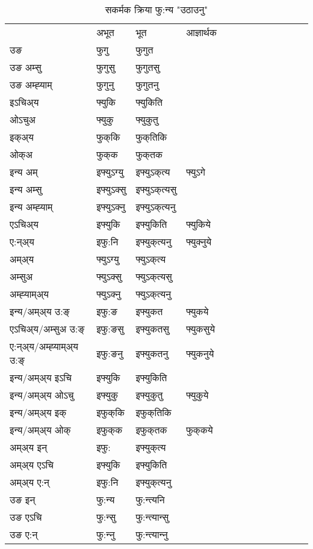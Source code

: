 \begin{table}[H]
\label{uk.vt} \centering
\caption{सकर्मक क्रिया  फु:न्य  "उठाउनु"  }
\begin{tabular}{l|l|l|l|l|l|l|l|l|l|l|l|l}  \toprule
&अभूत & भूत & आज्ञार्थक \\ 
उङ &फुगु &फुगुत \\ 
उङ अम्सु &फुगुसु &फुगुतसु \\ 
उङ अम्ह्‍याम् &फुगुनु &फुगुतनु \\ 
इऽचिअ्य &फ्युकि &फ्युकिति   \\ 
ओऽचुअ &फ्युकु &फ्युकुतु   \\ 
इक्अ्य &फुक्‌कि &फुक्‌तिकि   \\ 
ओक्अ &फुक्‌क &फुक्‌तक   \\ 
इन्य अम् & इफ्युऽग्यु  & इफ्युऽक्‌त्य &फ्युऽगे  \\ 
इन्य अम्सु & इफ्युऽक्सु  & इफ्युऽक्‌त्यसु   \\ 
इन्य अम्ह्‍याम् & इफ्युऽक्‍नु  & इफ्युऽक्‌त्यनु   \\ 
एऽचिअ्य & इफ्युकि & इफ्युकिति &फ्युकिये    \\ 
ए:न्अ्य & इफु:नि  & इफ्युक्‌त्यनु &फ्युक्‍नुये  \\ 
अम्अ्य & फ्युऽग्यु  & फ्युऽक्‌त्य  \\ 
अम्सुअ & फ्युऽक्सु & फ्युऽक्‌त्यसु  \\ 
अम्ह्‍याम्अ्य & फ्युऽक्‍नु  & फ्युऽक्‌त्यनु \\ 
\midrule
इन्य/अम्अ्य उ:ङ्‌&इफु:ङ & इफ्युकत &फ्युकये \\ 
एऽचिअ्य/अम्सुअ उ:ङ्‌ &इफु:ङसु & इफ्युकतसु &फ्युकसुये \\ 
ए:न्अ्य/अम्ह्‍याम्अ्य उ:ङ्‌ &इफु:ङनु & इफ्युकतनु &फ्युकनुये \\ 
इन्य/अम्अ्य इऽचि & इफ्युकि & इफ्युकिति    \\ 
इन्य/अम्अ्य ओऽचु & इफ्युकु & इफ्युकुतु  &फ्युकुये  \\ 
इन्य/अम्अ्य इक् & इफुक्‌कि & इफुक्‌तिकि   \\ 
इन्य/अम्अ्य ओक् & इफुक्‌क & इफुक्‌तक  &फुक्‌कये  \\ 
अम्अ्य इन् & इफु: & इफ्युक्‌त्य   \\ 
अम्अ्य एऽचि & इफ्युकि & इफ्युकिति    \\ 
अम्अ्य ए:न् & इफु:नि  & इफ्युक्‌त्यनु  \\ 
\midrule
उङ इन् & फु:न्य  & फु:न्त्यनि  \\ 
उङ एऽचि & फु:न्सु  & फु:न्त्यान्सु   \\ 
उङ ए:न्& फु:न्‍नु  & फु:न्त्यान्‍नु   \\ 
\bottomrule
\end{tabular}
\end{table}


